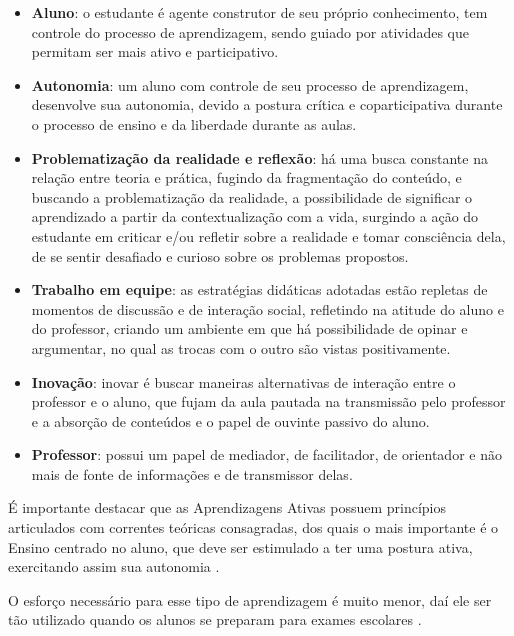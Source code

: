 \begin{citacao}
    \begin{itemize}
        \item \textbf{Aluno}: o estudante é agente construtor de seu próprio conhecimento, tem controle do processo de aprendizagem, sendo guiado por atividades que permitam ser mais ativo e participativo.
        \item \textbf{Autonomia}: um aluno com controle de seu processo de aprendizagem, desenvolve sua autonomia, devido a postura crítica e coparticipativa durante o processo de ensino e da liberdade durante as aulas.
        \item \textbf{Problematização da realidade e reflexão}: há uma busca constante na relação entre teoria e prática, fugindo da fragmentação do conteúdo, e buscando a problematização da realidade, a possibilidade de significar o aprendizado a partir da contextualização com a vida, surgindo a ação do estudante em criticar e/ou refletir sobre a realidade e tomar consciência dela, de se sentir desafiado e curioso sobre os problemas propostos.
        \item \textbf{Trabalho em equipe}: as estratégias didáticas adotadas estão repletas de momentos de discussão e de interação social, refletindo na atitude do aluno e do professor, criando um ambiente em que há possibilidade de opinar e argumentar, no qual as trocas com o outro são vistas positivamente.
        \item \textbf{Inovação}: inovar é buscar maneiras alternativas de interação entre o professor e o aluno, que fujam da aula pautada na transmissão pelo professor e a absorção de conteúdos e o papel de ouvinte passivo do aluno.
        \item \textbf{Professor}: possui um papel de mediador, de facilitador, de orientador e não mais de fonte de informações e de transmissor delas.
    \end{itemize}
\end{citacao}

\begin{citacao}
    É importante destacar que as Aprendizagens Ativas possuem princípios articulados com correntes teóricas consagradas, dos quais o mais importante é o Ensino centrado no aluno, que deve ser estimulado a ter uma postura ativa, exercitando assim sua autonomia \cite[p. 33]{SOUSA2022}.
\end{citacao}

O esforço necessário para esse tipo de aprendizagem é muito menor, daí ele ser tão utilizado quando os alunos se preparam para exames escolares \cite[p. 27]{SOUSA2022}.

